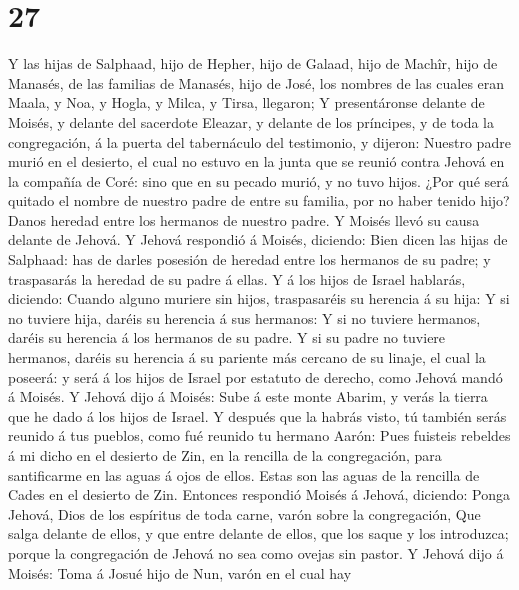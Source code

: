 \hypertarget{section-26}{%
\section{27}\label{section-26}}

 Y las hijas de Salphaad, hijo de Hepher, hijo de Galaad,
hijo de Machîr, hijo de Manasés, de las familias de Manasés, hijo de
José, los nombres de las cuales eran Maala, y Noa, y Hogla, y Milca, y
Tirsa, llegaron;  Y presentáronse delante de Moisés, y
delante del sacerdote Eleazar, y delante de los príncipes, y de toda la
congregación, á la puerta del tabernáculo del testimonio, y dijeron:
 Nuestro padre murió en el desierto, el cual no estuvo en la
junta que se reunió contra Jehová en la compañía de Coré: sino que en su
pecado murió, y no tuvo hijos.  ¿Por qué será quitado el
nombre de nuestro padre de entre su familia, por no haber tenido hijo?
Danos heredad entre los hermanos de nuestro padre.  Y Moisés
llevó su causa delante de Jehová.  Y Jehová respondió á
Moisés, diciendo:  Bien dicen las hijas de Salphaad: has de
darles posesión de heredad entre los hermanos de su padre; y traspasarás
la heredad de su padre á ellas.  Y á los hijos de Israel
hablarás, diciendo: Cuando alguno muriere sin hijos, traspasaréis su
herencia á su hija:  Y si no tuviere hija, daréis su
herencia á sus hermanos:  Y si no tuviere hermanos, daréis
su herencia á los hermanos de su padre.  Y si su padre no
tuviere hermanos, daréis su herencia á su pariente más cercano de su
linaje, el cual la poseerá: y será á los hijos de Israel por estatuto de
derecho, como Jehová mandó á Moisés.  Y Jehová dijo á
Moisés: Sube á este monte Abarim, y verás la tierra que he dado á los
hijos de Israel.  Y después que la habrás visto, tú también
serás reunido á tus pueblos, como fué reunido tu hermano Aarón:
 Pues fuisteis rebeldes á mi dicho en el desierto de Zin,
en la rencilla de la congregación, para santificarme en las aguas á ojos
de ellos. Estas son las aguas de la rencilla de Cades en el desierto de
Zin.  Entonces respondió Moisés á Jehová, diciendo:
 Ponga Jehová, Dios de los espíritus de toda carne, varón
sobre la congregación,  Que salga delante de ellos, y que
entre delante de ellos, que los saque y los introduzca; porque la
congregación de Jehová no sea como ovejas sin pastor.  Y
Jehová dijo á Moisés: Toma á Josué hijo de Nun, varón en el cual hay
